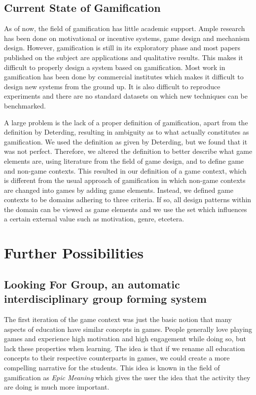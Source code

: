 \documentclass[11pt]{article}
\begin{document}
\subsection{Current State of Gamification}
As of now, the field of gamification has little academic support. Ample research has been done on motivational or incentive systems, game design and mechanism design.
However, gamification is still in its exploratory phase and most papers published on the subject are applications and qualitative results. This makes it difficult to properly design a system based on gamification. Most work in gamification has been done by commercial institutes which makes it difficult to design new systems from the ground up. It is also difficult to reproduce experiments and there are no standard datasets on which new techniques can be benchmarked.

A large problem is the lack of a proper definition of gamification, apart from the definition by Deterding, resulting in ambiguity as to what actually constitutes as gamification. We used the definition as given by Deterding, but we found that it was not perfect. Therefore, we altered the definition to better describe what game elements are, using literature from the field of game design, and to define game and non-game contexts. This resulted in our definition of a game context, which is different from the usual approach of gamification in which non-game contexts are changed into games by adding game elements. Instead, we defined game contexts to be domains adhering to three criteria. If so, all design patterns within the domain can be viewed as game elements and we use the set which influences a certain external value such as motivation, genre, etcetera.


\pagebreak
\small{


}

\pagebreak
\appendix
\section{Further Possibilities}
\subsection{Looking For Group, an automatic interdisciplinary group forming system}
The first iteration of the game context was just the basic notion that many aspects of education have similar concepts in games. People generally love playing games and experience high motivation and high engagement while doing so, but lack these properties when learning. The idea is that if we rename all education concepts to their respective counterparts in games, we could create a more compelling narrative for the students. This idea is known in the field of gamification as \emph{Epic Meaning} which gives the user the idea that the activity they are doing is much more important. 
\end{document}

